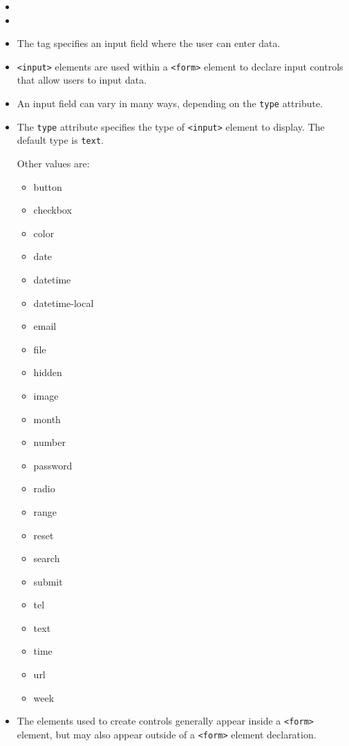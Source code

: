 \begin{itemize}
\item
{}
\item
{}
\end{itemize}

\begin{itemize}
\item
The 
tag specifies an input field where the user can enter data.

\item
\verb|<input>| elements are used within a \verb|<form>| element to declare input controls that allow users to input data.

\item
An input field can vary in many ways, depending on the \verb|type| attribute.

\item
The \verb|type| attribute specifies the type of \verb|<input>| element to display.
The default type is \verb|text|.

Other values are:
\begin{itemize}
\item button
\item checkbox
\item color
\item date 
\item datetime 
\item datetime-local 
\item email 
\item file
\item hidden
\item image
\item month 
\item number 
\item password
\item radio
\item range 
\item reset
\item search
\item submit
\item tel
\item text
\item time 
\item url
\item week
\end{itemize}
\item
The elements used to create controls generally appear inside a \verb|<form>| 
element, but may also appear outside of a \verb|<form>| element declaration.
\end{itemize}

